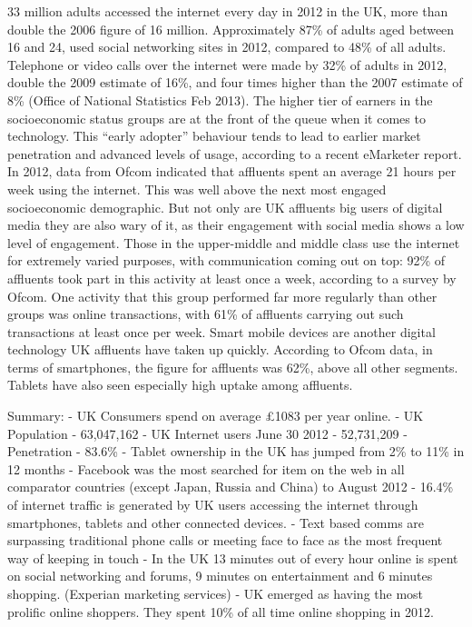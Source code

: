 \documentclass[letterpaper,10pt,openany,oneside,english]{sphinxmanual}
\begin{document}
33 million adults accessed the internet every day in 2012 in the UK, more than double the 2006 figure of 16 million. Approximately 87\% of adults aged between 16 and 24, used social networking sites in 2012, compared to 48\% of all adults. Telephone or video calls over the internet were made by 32\% of adults in 2012, double the 2009 estimate of 16\%, and four times higher than the 2007 estimate of 8\% (Office of National Statistics Feb 2013). The higher tier of earners in the socioeconomic status groups are at the front of the queue when it comes to technology. This “early adopter” behaviour tends to lead to earlier market penetration and advanced levels of usage, according to a recent eMarketer report. In 2012, data from Ofcom indicated that affluents spent an average 21 hours per week using the internet. This was well above the next most engaged socioeconomic demographic. But not only are UK affluents big users of digital media they are also wary of it, as their engagement with social media shows a low level of engagement. Those in the upper-middle and middle class use the internet for extremely varied purposes, with communication coming out on top: 92\% of affluents took part in this activity at least once a week, according to a survey by Ofcom. One activity that this group performed far more regularly than other groups was online transactions, with 61\% of affluents carrying out such transactions at least once per week. Smart mobile devices are another digital technology UK affluents have taken up quickly. According to Ofcom data, in terms of smartphones, the figure for affluents was 62\%, above all other segments. Tablets have also seen especially high uptake among affluents.

Summary:
- UK Consumers spend on average £1083 per year online.
- UK Population - 63,047,162
- UK Internet users June 30 2012 - 52,731,209
- Penetration - 83.6\%
- Tablet ownership in the UK has jumped from 2\% to 11\% in 12 months
- Facebook was the most searched for item on the web in all comparator countries (except Japan, Russia and China) to August 2012
- 16.4\% of internet traffic is generated by UK users accessing the internet through smartphones, tablets and other connected devices.
- Text based comms are surpassing traditional phone calls or meeting face to face as the most frequent way of keeping in touch
- In the UK 13 minutes out of every hour online is spent on social networking and forums, 9 minutes on entertainment and 6 minutes shopping. (Experian marketing services)
- UK emerged as having the most prolific online shoppers. They spent 10\% of all time online shopping in 2012.
\end{document}
